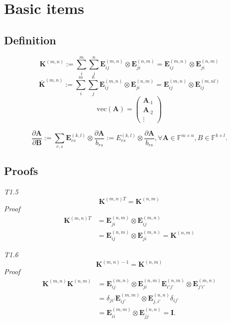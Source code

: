\documentclass[a4paper,11pt]{article}
\def\m#1{\mathbf{#1}}
\def\v#1{\mathrm{vec}({\mathbf{#1}})}
\def\F{\mathbb{F}}
\begin{document}
{}


\section{Basic items}
\subsection{Definition}
\begin{equation}
    \m K^{(m,n)} := \sum_i^m \sum_j^n \m E_{ij}^{(m,n)} \otimes \m E_{ji}^{(n,m)} = \m E_{ij}^{(m,n)} \otimes \m E_{ji}^{(n,m)}
\end{equation}
\begin{equation}
    \bar{\m K}^{(m,n)} := \sum_i^m \sum_j^n \m E_{ij}^{(m,n)} \otimes \m E_{ji}^{(n,m)} = \m E_{ij}^{(m,n)} \otimes \m E_{ij}^{(m,nl)}
\end{equation}
\begin{equation}
    \v A = \left(\begin{array}{c} \m A_{\cdot 1} \\ \m A_{\cdot 2} \\ \vdots \end{array}\right)
\end{equation}

\begin{equation}
    \frac{\partial \m A}{\partial \m B} := \sum_{r,s} \m E^{(k,l)}_{rs} \otimes \frac{\partial \m A}{b_{rs}} := E^{(k,l)}_{rs} \otimes \frac{\partial \m A}{b_{rs}}, \forall \m A \in \F^{m\times n}, B \in \F^{k\times l}.
\end{equation}
\subsection{Proofs}
\emph{T1.5}
\begin{equation}
    \m K^{(m,n)T} = \m K^{(n,m)}
\end{equation}
\emph{Proof}
\begin{align}
    \m K^{(m,n)T}& = \m E^{(n,m)}_{ji} \otimes \m E^{(m,n)}_{ij} \\ 
    & = \m E^{(n,m)}_{ij} \otimes \m E^{(m,n)}_{ji} = \m K^{(n,m)}
\end{align}

\emph{T1.6}
\begin{equation}
    \m K^{(m,n)-1} = \m K^{(n,m)} 
\end{equation}
\emph{Proof}
\begin{align}
    \m K^{(m,n)} \m K^{(n,m)} & =  \m E_{ij}^{(m,n)} \otimes \m E_{ji}^{(n,m)}  \m E_{i'j'}^{(n,m)} \otimes \m E_{j'i'}^{(m,n)} \\ 
    & = \delta_{ji'}\m E^{(m,m)}_{ij'} \otimes \m E^{(n,n)}_{j,i'}\delta_{ij'} \\ 
    & = \m E_{ii}^{(m,m)} \otimes \m E_{jj}^{(n,n)} = \m I.
\end{align}
\end{document}

